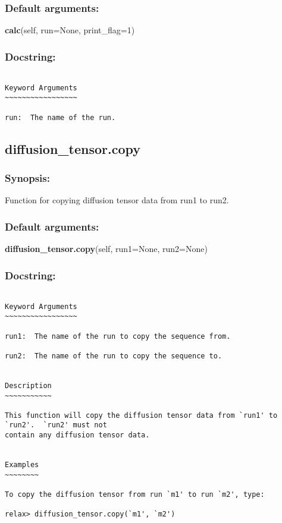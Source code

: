 \subsubsection{Default arguments:}

\textsf{\textbf{calc}(self, run=None, print\_flag=1)
}


\subsubsection{Docstring:}

{\scriptsize
\begin{verbatim}

Keyword Arguments
~~~~~~~~~~~~~~~~~

run:  The name of the run.
\end{verbatim}
}



\newpage

\subsection{diffusion\_tensor.copy}


\subsubsection{Synopsis:}

Function for copying diffusion tensor data from run1 to run2.

\subsubsection{Default arguments:}

\textsf{\textbf{diffusion\_tensor.copy}(self, run1=None, run2=None)
}


\subsubsection{Docstring:}

{\scriptsize
\begin{verbatim}

Keyword Arguments
~~~~~~~~~~~~~~~~~

run1:  The name of the run to copy the sequence from.

run2:  The name of the run to copy the sequence to.


Description
~~~~~~~~~~~

This function will copy the diffusion tensor data from `run1' to `run2'.  `run2' must not
contain any diffusion tensor data.


Examples
~~~~~~~~

To copy the diffusion tensor from run `m1' to run `m2', type:

relax> diffusion_tensor.copy(`m1', `m2')
\end{verbatim}
}



